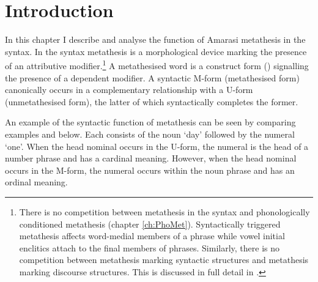 
\section{Introduction}
In this chapter I describe and analyse the function of Amarasi metathesis in the syntax.
In the syntax metathesis is a morphological device
marking the presence of an attributive modifier.\footnote{
		There is no competition between metathesis in the syntax
		and phonologically conditioned metathesis (chapter \ref{ch:PhoMet}).
		Syntactically triggered metathesis affects word-medial members of
		a phrase while vowel initial enclitics attach to the final members of phrases.
		Similarly, there is no competition between metathesis marking syntactic
		structures and metathesis marking discourse structures.
		This is discussed in full detail in .}
A metathesised word is a construct form ()
signalling the presence of a dependent modifier.
A syntactic M-form (metathesised form) canonically
occurs in a complementary relationship
with a \mbox{U-form} (unmetathesised form),
the latter of which syntactically completes the former.

An example of the syntactic function of metathesis
can be seen by comparing examples
 and  below.
Each consists of the noun  `day'
followed by the numeral  `one'.
When the head nominal occurs in the U-form,
the numeral is the head of a number phrase and has a cardinal meaning.
However, when the head nominal occurs in the M-form,
the numeral occurs within the noun phrase and has an ordinal meaning.

\begin{multicols}{2}
	\begin{exe}
	\let\eachwordone=\textnormal
	\let\eachwordtwo=\ve
		\label{ex:NenoMeseq}
		\label{ex:NeonMeseq}
	\end{exe}
\end{multicols}

